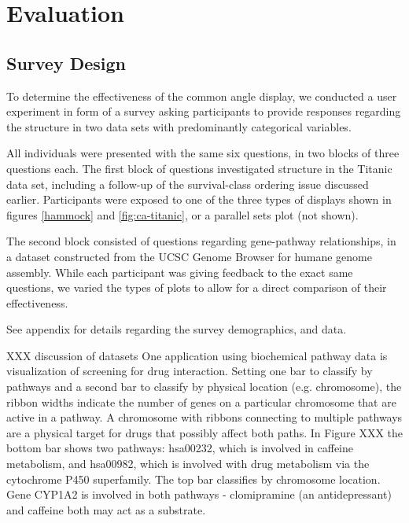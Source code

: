 \section{Evaluation}
\subsection{Survey Design}
To determine the effectiveness of the common angle display, we conducted a user experiment in form of a survey asking participants to provide responses regarding the structure in two data sets with predominantly categorical variables.

 All individuals were presented with the same six questions, in two blocks of three questions each. The first block of questions investigated structure in the Titanic data set, including a follow-up of the survival-class ordering issue discussed earlier. Participants were exposed to one of the three types of displays shown in figures \ref{hammock} and \ref{fig:ca-titanic}, or a parallel sets plot (not shown).
 
 The second block consisted of questions regarding gene-pathway relationships, in a dataset constructed from the UCSC Genome Browser \cite{ucsc:2002} for humane genome assembly. 
 While each participant was giving feedback to the exact same questions, we varied the types of plots to allow for a direct comparison of their effectiveness.




%

% 


See appendix for details regarding the survey demographics, and data.

XXX discussion of datasets
One application using biochemical pathway data is visualization of screening for drug interaction. Setting one bar to classify by pathways and a second bar to classify by physical location (e.g. chromosome), the ribbon widths indicate the number of genes on a particular chromosome that are active in a pathway. A chromosome with ribbons connecting to multiple pathways are a physical target for drugs that possibly affect both paths. In Figure XXX the bottom bar shows two pathways: hsa00232, which is involved in caffeine metabolism, and hsa00982, which is involved with drug metabolism via the cytochrome P450 superfamily. The top bar classifies by chromosome location. Gene CYP1A2 is involved in both pathways - clomipramine (an antidepressant) and caffeine both may act as a substrate.



